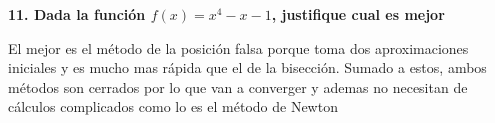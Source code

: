 \documentclass[12pt]{article}
\begin{document}
\textbf{11. Dada la función $f(x) = x^4-x- 1$, justifique cual es mejor } 

El mejor es el método de la posición falsa porque toma dos aproximaciones iniciales y es mucho mas rápida que el de la bisección. Sumado a estos, ambos métodos son cerrados por lo que van a converger y ademas no necesitan de cálculos complicados 
como lo es el método de Newton 

\vspace{0.5cm}
\end{document}
